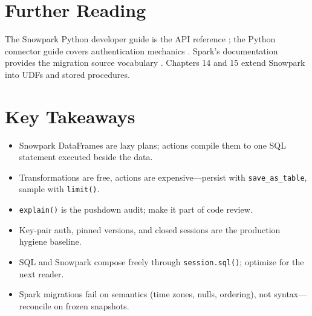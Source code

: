 \section{Further Reading}
The Snowpark Python developer guide is the API reference \cite{snowflakeSnowparkPythonDocs}; the Python connector guide covers authentication mechanics \cite{snowflakeConnectorPythonDocs}. Spark's documentation provides the migration source vocabulary \cite{sparkDocs}. Chapters 14 and 15 extend Snowpark into UDFs and stored procedures.

\section*{Key Takeaways}
\begin{itemize}
    \item Snowpark DataFrames are lazy plans; actions compile them to one SQL statement executed beside the data.
    \item Transformations are free, actions are expensive---persist with \texttt{save\_as\_table}, sample with \texttt{limit()}.
    \item \texttt{explain()} is the pushdown audit; make it part of code review.
    \item Key-pair auth, pinned versions, and closed sessions are the production hygiene baseline.
    \item SQL and Snowpark compose freely through \texttt{session.sql()}; optimize for the next reader.
    \item Spark migrations fail on semantics (time zones, nulls, ordering), not syntax---reconcile on frozen snapshots.
\end{itemize}

